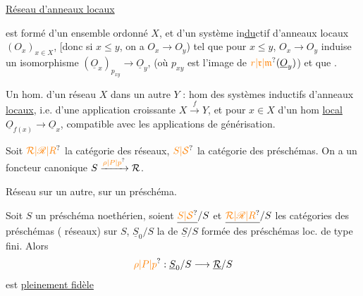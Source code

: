 \uline{Réseau d'anneaux locaux}

est formé d'un ensemble ordonné $X$, et  d'un système in\uline{du}ctif d'anneaux locaux $(O_x)_{x\in X}$, [donc si $x\leq y$, on a $O_x\to O_y$) tel que pour $x\leq y$, $O_x\to O_y$ induise un isomorphisme $(\underline{O}_x)_{p_{xy}}\to\underline{O}_y$, (où $p_{xy}$ est l'image  de $\unsure{r|\mathfrak{r}|\mathfrak{m}}(\underline{O}_y)$) et que  .

Un hom. d'un réseau $X$ dans un autre $Y$ : hom des systèmes inductifs d'anneaux \uline{locaux}, i.e.  d'une application  croissante $X\xrightarrow{f}Y$, et pour  $x\in X$ d'un hom \uline{local} $\underline{O}_{f(x)}\to\underline{O}_x$, compatible avec les applications de  générisation.

Soit $\unsure{\mathcal R|\mathscr R|R}$ la catégorie des réseaux, $\unsure{S|\mathcal S}$ la catégorie des préschémas. On a un foncteur canonique $S\xrightarrow{\unsure{\rho|P|p}}\mathcal R$.

Réseau sur un autre, sur un préschéma.

Soit $S$ un préschéma  noethérien,
soient $\underline{\unsure{S|\mathcal S}}/S$ et $\underline{\unsure{\mathcal R|\mathscr R|R}}/S$ les catégories des préschémas ( réseaux) sur $S$, $\underline{S}_0/S$ la  de $\underline{S}/S$ formée des préschémas loc. de type fini. Alors 
\[
\unsure{\rho|P|p}:\underline{S}_0/S\longrightarrow\underline{\mathcal R}/S
\]
est \uline{pleinement fidèle}

